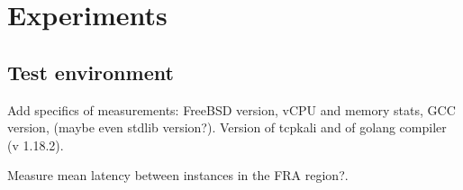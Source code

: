\section{Experiments}
\subsection{Test environment}
Add specifics of measurements: FreeBSD version, vCPU and memory stats, GCC version, (maybe even stdlib version?). Version of tcpkali and of golang compiler (v 1.18.2). 

Measure mean latency between instances in the FRA region?.